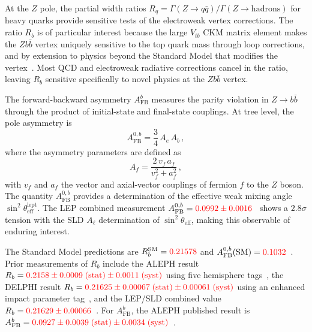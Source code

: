 \documentclass[11pt,a4paper]{article}
\newcommand{\external}[1]{\textcolor{red}{#1}}
\begin{document}
At the $Z$ pole, the partial width ratios $R_q = \Gamma(Z \to q\bar{q}) /
\Gamma(Z \to \mathrm{hadrons})$ for heavy quarks provide sensitive tests of
the electroweak vertex corrections.  The ratio $R_b$ is of particular
interest because the large $V_{tb}$ CKM matrix element makes the $Zb\bar{b}$
vertex uniquely sensitive to the top quark mass through loop corrections,
and by extension to physics beyond the Standard Model that modifies the
vertex~\cite{ALEPH:Rb:1996, LEP:EWWG:2005}.  Most QCD and electroweak
radiative corrections cancel in the ratio, leaving $R_b$ sensitive
specifically to novel physics at the $Zb\bar{b}$ vertex.

The forward-backward asymmetry $A_\mathrm{FB}^b$ measures the parity
violation in $Z \to b\bar{b}$ through the product of initial-state and
final-state couplings.  At tree level, the pole asymmetry is
\begin{equation}
  A_\mathrm{FB}^{0,b} = \frac{3}{4}\, A_e \, A_b\,,
  \label{eq:afb0b}
\end{equation}
where the asymmetry parameters are defined as
\begin{equation}
  A_f = \frac{2\, v_f \, a_f}{v_f^2 + a_f^2}\,,
  \label{eq:Af}
\end{equation}
with $v_f$ and $a_f$ the vector and axial-vector couplings of fermion $f$
to the $Z$ boson.  The quantity $A_\mathrm{FB}^{0,b}$ provides a
determination of the effective weak mixing angle $\sin^2\theta_\mathrm{eff}^{\mathrm{lept}}$.
The LEP combined measurement $A_\mathrm{FB}^{0,b} =
\external{0.0992 \pm 0.0016}$~\cite{LEP:EWWG:2005} shows a $2.8\sigma$
tension with the SLD $A_\ell$ determination of $\sin^2\theta_\mathrm{eff}$,
making this observable of enduring interest.

The Standard Model predictions are $R_b^\mathrm{SM} = \external{0.21578}$
and $A_\mathrm{FB}^{0,b}(\mathrm{SM}) = \external{0.1032}$~\cite{LEP:EWWG:2005}.
Prior measurements of $R_b$ include the ALEPH result
$R_b = \external{0.2158 \pm 0.0009\;\mathrm{(stat)} \pm 0.0011\;\mathrm{(syst)}}$
using five hemisphere tags~\cite{ALEPH:Rb:1996}, the DELPHI result
$R_b = \external{0.21625 \pm 0.00067\;\mathrm{(stat)} \pm 0.00061\;\mathrm{(syst)}}$
using an enhanced impact parameter tag~\cite{DELPHI:Rb}, and the LEP/SLD
combined value $R_b = \external{0.21629 \pm 0.00066}$~\cite{LEP:EWWG:2005}.
For $A_\mathrm{FB}^b$, the ALEPH published result is
$A_\mathrm{FB}^b = \external{0.0927 \pm 0.0039\;\mathrm{(stat)} \pm 0.0034\;\mathrm{(syst)}}$~\cite{ALEPH:AFBb}.
\end{document}
